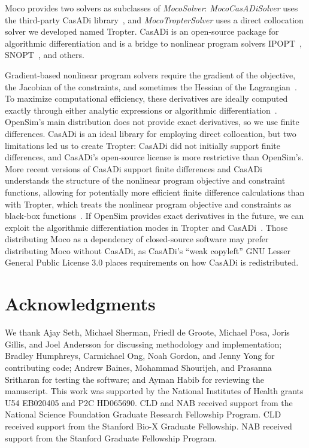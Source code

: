\documentclass[10pt,letterpaper]{article}
\begin{document}
Moco provides two solvers as subclasses of \textit{MocoSolver}: \textit{MocoCasADiSolver} uses the third-party CasADi library~\cite{Andersson:2019}, and \textit{MocoTropterSolver} uses a direct collocation solver we developed named Tropter. CasADi is an open-source package for algorithmic differentiation and is a bridge to nonlinear program solvers IPOPT~\cite{Wachter:2006}, SNOPT~\cite{Gill:2005}, and others.

Gradient-based nonlinear program solvers require the gradient of the objective, the Jacobian of the constraints, and sometimes the Hessian of the Lagrangian~\cite{Betts:2010}. To maximize computational efficiency, these derivatives are ideally computed exactly through either analytic expressions or algorithmic differentiation~\cite{Andersson:2019,Walther:2003}. OpenSim’s main distribution does not provide exact derivatives, so we use finite differences. CasADi is an ideal library for employing direct collocation, but two limitations led us to create Tropter: CasADi did not initially support finite differences, and CasADi’s open-source license is more restrictive than OpenSim’s. More recent versions of CasADi support finite differences and CasADi understands the structure of the nonlinear program objective and constraint functions, allowing for potentially more efficient finite difference calculations than with Tropter, which treats the nonlinear program objective and constraints as black-box functions~\cite{Patterson:2012}. If OpenSim provides exact derivatives in the future, we can exploit the algorithmic differentiation modes in Tropter and CasADi~\cite{Falisse:2019a}. Those distributing Moco as a dependency of closed-source software may prefer distributing Moco without CasADi, as CasADi’s “weak copyleft” GNU Lesser General Public License 3.0 places requirements on how CasADi is redistributed.


\section*{Acknowledgments}

We thank Ajay Seth, Michael Sherman, Friedl de Groote, Michael Posa, Joris Gillis, and Joel Andersson for discussing methodology and implementation; Bradley Humphreys, Carmichael Ong, Noah Gordon, and Jenny Yong for contributing code; Andrew Baines, Mohammad Shourijeh, and Prasanna Sritharan for testing the software; and Ayman Habib for reviewing the manuscript.
This work was supported by the National Institutes of Health grants U54 EB020405 and P2C HD065690. CLD and NAB received support from the National Science Foundation Graduate Research Fellowship Program. CLD received support from the Stanford Bio-X Graduate Fellowship. NAB received support from the Stanford Graduate Fellowship Program.
\end{document}
